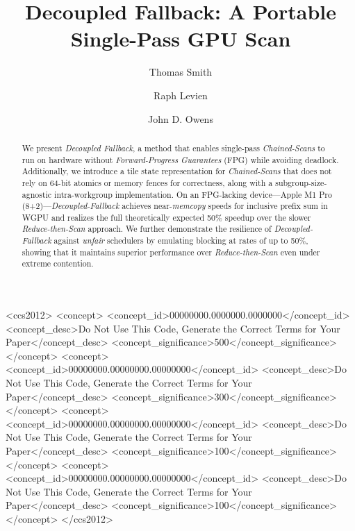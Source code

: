 \documentclass[sigconf]{acmart}
\begin{document}
\title{Decoupled Fallback: A Portable Single-Pass GPU Scan}

\author{Thomas Smith}

\author{Raph Levien}

\author{John D. Owens}

\renewcommand{\shortauthors}{Smith et al.}

\begin{abstract}
  We present \emph{Decoupled Fallback}, a method that enables single-pass \emph{Chained-Scans} to run on hardware without \emph{Forward-Progress Guarantees} (FPG) while avoiding deadlock. Additionally, we introduce a tile state representation for \emph{Chained-Scans} that does not rely on 64-bit atomics or memory fences for correctness, along with a subgroup-size-agnostic intra-workgroup implementation. On an FPG-lacking device---Apple M1 Pro (8+2)---\emph{Decoupled-Fallback} achieves near-\emph{memcopy} speeds for inclusive prefix sum in WGPU and realizes the full theoretically expected 50\% speedup over the slower \emph{Reduce-then-Scan} approach. We further demonstrate the resilience of \emph{Decoupled-Fallback} against \emph{unfair} schedulers by emulating blocking at rates of up to 50\%, showing that it maintains superior performance over \emph{Reduce-then-Scan} even under extreme contention.
\end{abstract}

\begin{CCSXML}
  <ccs2012>
  <concept>
  <concept_id>00000000.0000000.0000000</concept_id>
  <concept_desc>Do Not Use This Code, Generate the Correct Terms for Your Paper</concept_desc>
  <concept_significance>500</concept_significance>
  </concept>
  <concept>
  <concept_id>00000000.00000000.00000000</concept_id>
  <concept_desc>Do Not Use This Code, Generate the Correct Terms for Your Paper</concept_desc>
  <concept_significance>300</concept_significance>
  </concept>
  <concept>
  <concept_id>00000000.00000000.00000000</concept_id>
  <concept_desc>Do Not Use This Code, Generate the Correct Terms for Your Paper</concept_desc>
  <concept_significance>100</concept_significance>
  </concept>
  <concept>
  <concept_id>00000000.00000000.00000000</concept_id>
  <concept_desc>Do Not Use This Code, Generate the Correct Terms for Your Paper</concept_desc>
  <concept_significance>100</concept_significance>
  </concept>
  </ccs2012>
\end{CCSXML}
\end{document}
